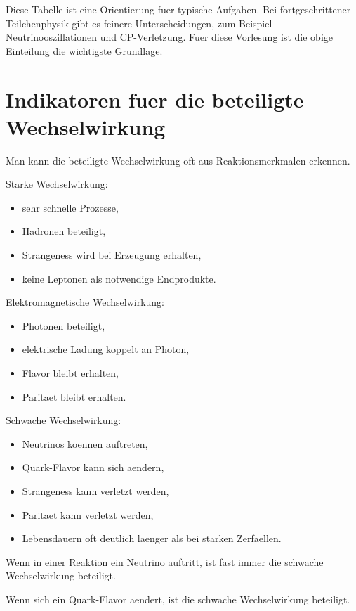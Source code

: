 \begin{notebox}
Diese Tabelle ist eine Orientierung fuer typische Aufgaben.
Bei fortgeschrittener Teilchenphysik gibt es feinere Unterscheidungen, zum Beispiel
Neutrinooszillationen und CP-Verletzung.
Fuer diese Vorlesung ist die obige Einteilung die wichtigste Grundlage.
\end{notebox}

\section{Indikatoren fuer die beteiligte Wechselwirkung}

\begin{conceptbox}
Man kann die beteiligte Wechselwirkung oft aus Reaktionsmerkmalen erkennen.

Starke Wechselwirkung:
\begin{itemize}
    \item sehr schnelle Prozesse,
    \item Hadronen beteiligt,
    \item Strangeness wird bei Erzeugung erhalten,
    \item keine Leptonen als notwendige Endprodukte.
\end{itemize}

Elektromagnetische Wechselwirkung:
\begin{itemize}
    \item Photonen beteiligt,
    \item elektrische Ladung koppelt an Photon,
    \item Flavor bleibt erhalten,
    \item Paritaet bleibt erhalten.
\end{itemize}

Schwache Wechselwirkung:
\begin{itemize}
    \item Neutrinos koennen auftreten,
    \item Quark-Flavor kann sich aendern,
    \item Strangeness kann verletzt werden,
    \item Paritaet kann verletzt werden,
    \item Lebensdauern oft deutlich laenger als bei starken Zerfaellen.
\end{itemize}
\end{conceptbox}

\begin{examtipbox}
Wenn in einer Reaktion ein Neutrino auftritt, ist fast immer die schwache
Wechselwirkung beteiligt.

Wenn sich ein Quark-Flavor aendert, ist die schwache Wechselwirkung beteiligt.
\end{examtipbox}

